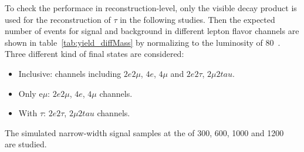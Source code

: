 To check the performace in reconstruction-level, only the visible decay product is used for the reconstruction of $\tau$ in the following studies.
Then the expected number of events for signal and \qqZZ background in different lepton flavor channels are shown in table~\ref{tab:yield_diffMass} by normalizing to the luminosity of 80~\ifb.
Three different kind of final states are considered:
\begin{itemize}
	\item Inclusive: channels including $2e2\mu$, $4e$, $4\mu$ and $2e2\tau$, $2\mu2tau$.
	\item Only e$\mu$: $2e2\mu$, $4e$, $4\mu$ channels.
	\item With $\tau$: $2e2\tau$, $2\mu2tau$ channels.
\end{itemize}
The simulated narrow-width signal samples at the \mH of 300, 600, 1000 and 1200~\gev~ are studied.

